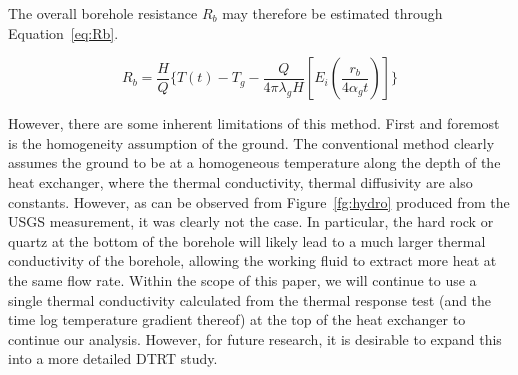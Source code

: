 	The overall borehole resistance $R_b$ may therefore be estimated through Equation~\ref{eq:Rb}\cite{beier_situ_2012}.
	
	\begin{equation}
		R_b = \frac{H}{Q}\{ T(t) - T_g -\frac{Q}{4\pi \lambda_g H} [E_i(\frac{r_b}{4 \alpha_g t})]   \}\label{eq:Rb}
	\end{equation}
	
	However, there are some inherent limitations of this method. First and foremost is the homogeneity assumption of the ground. The conventional method clearly assumes the ground to be at a homogeneous temperature along the depth of the heat exchanger, where the thermal conductivity, thermal diffusivity are also constants. However, as can be observed from Figure~\ref{fg:hydro} produced from the USGS measurement, it was clearly not the case. In particular, the hard rock or quartz at the bottom of the borehole will likely lead to a much larger thermal conductivity of the borehole, allowing the working fluid to extract more heat at the same flow rate. Within the scope of this paper, we will continue to use a single thermal conductivity calculated from the thermal response test (and the time log temperature gradient thereof) at the top of the heat exchanger to continue our analysis. However, for future research, it is desirable to expand this into a more detailed DTRT study.
	
	
